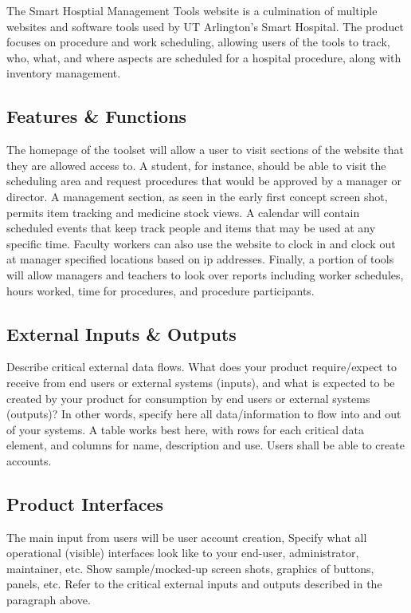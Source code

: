 The Smart Hosptial Management Tools website is a culmination of multiple websites and software tools used by UT Arlington's Smart Hospital. The product focuses on procedure and work scheduling, allowing users of the tools to track, who, what, and where aspects are scheduled for a hospital procedure, along with inventory management.

\subsection{Features \& Functions}
The homepage of the toolset will allow a user to visit sections of the website that they are allowed access to. A student, for instance, should be able to visit the scheduling area and request procedures that would be approved by a manager or director. A management section, as seen in the early first concept screen shot, permits item tracking and medicine stock views. A calendar will contain scheduled events that keep track people and items that may be used at any specific time. Faculty workers can also use the website to clock in and clock out at manager specified locations based on ip addresses. Finally, a portion of tools will allow managers and teachers to look over reports including worker schedules, hours worked, time for procedures, and procedure participants.

\subsection{External Inputs \& Outputs}
Describe critical external data flows. What does your product require/expect to receive from end users or external systems (inputs), and what is expected to be created by your product for consumption by end users or external systems (outputs)? In other words, specify here all data/information to flow into and out of your systems. A table works best here, with rows for each critical data element, and columns for name, description and use.
Users shall be able to create accounts.

\subsection{Product Interfaces}
The main input from users will be user account creation, 
Specify what all operational (visible) interfaces look like to your end-user, administrator, maintainer, etc. Show sample/mocked-up screen shots, graphics of buttons, panels, etc. Refer to the critical external inputs and outputs described in the paragraph above.